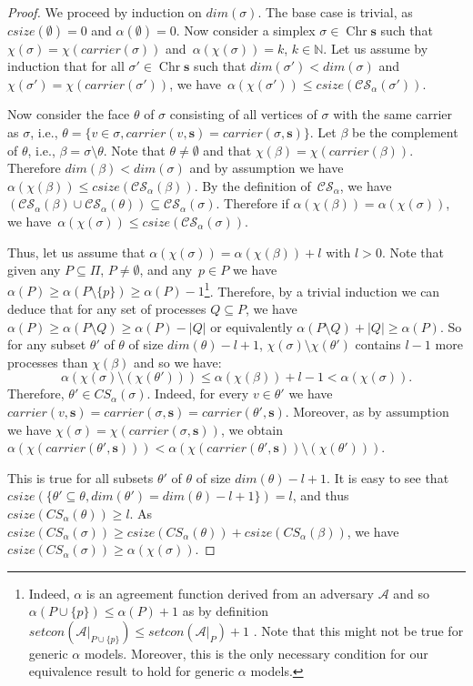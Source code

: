\documentclass[a4paper]{article}
\def\A{\ensuremath{\mathcal{A}}}
\def\HSS{\mathit{csize}}
\newcommand{\setcon}{\mathit{setcon}}
\def\s {\mathbf{s}}
\def\Chr{\operatorname{Chr}}
\def\Car{\mathit{carrier}}
\begin{document}
\begin{proof} 
We proceed by induction on ${\mathit{dim}}(\sigma)$. 
The base case is trivial, as 
$\HSS(\emptyset)=0$ and $\alpha(\emptyset)=0$.
Now consider a simplex $\sigma\in\Chr\s$ such that 
$\chi(\sigma)=\chi(\Car(\sigma))$ and~$\alpha(\chi(\sigma))= k$, $k\in\mathbb{N}$. 
Let us assume by induction that for all $\sigma'\in \Chr \s$ such that 
${\mathit{dim}}(\sigma')<{\mathit{dim}}(\sigma)$ and $\chi(\sigma')=\chi(\Car(\sigma'))$, we 
have~$\alpha(\chi(\sigma'))\leq \HSS(\mathcal{CS}_\alpha(\sigma'))$.

Now consider the face $\theta$ of $\sigma$ consisting of all vertices of $\sigma$ with the
same carrier as $\sigma$, i.e., $\theta=\{v\in\sigma, \Car(v,\s)=\Car(\sigma,\s)\}$. 
Let $\beta$ be the complement of $\theta$, i.e., $\beta=\sigma\setminus\theta$.
Note that $\theta\neq\emptyset$ and that $\chi(\beta)=\chi(\Car(\beta))$.
Therefore ${\mathit{dim}}(\beta)<{\mathit{dim}}(\sigma)$ and by assumption we have 
$\alpha(\chi(\beta))\leq \HSS(\mathcal{CS}_\alpha(\beta))$.
By the definition of~$\mathcal{CS}_\alpha$, we have 
$\left(\mathcal{CS}_\alpha(\beta)\cup\mathcal{CS}_\alpha(\theta)\right)\subseteq \mathcal{CS}_\alpha(\sigma)$.
Therefore if $\alpha(\chi(\beta))=\alpha(\chi(\sigma))$, we 
have~$\alpha(\chi(\sigma))\leq \HSS(\mathcal{CS}_\alpha(\sigma))$.

Thus, let us assume that $\alpha(\chi(\sigma))=\alpha(\chi(\beta))+l$ with $l>0$.
Note that given any $P\subseteq\Pi$, $P\neq\emptyset$, and any~$p\in P$ we have 
$\alpha(P)\geq\alpha(P\setminus\{p\})\geq\alpha(P)-1$\footnote{Indeed, $\alpha$
is an agreement function derived from an adversary $\A$ and so 
$\alpha(P\cup\{p\})\leq \alpha(P)+1$ as by definition $\setcon(\A|_{P\cup\{p\}})\leq \setcon(\A|_P)+1$ . 
Note that this might not be true for generic $\alpha$ models. Moreover, this 
is the only necessary condition for our equivalence result to hold for generic
$\alpha$ models.}. 
Therefore, by a trivial induction we can deduce that for any set of 
processes $Q\subseteq P$, we have $\alpha(P)\geq\alpha(P\setminus Q)\geq\alpha(P)-|Q|$ 
or equivalently $\alpha(P\setminus Q)+|Q|\geq\alpha(P)$.
So for any subset $\theta'$ of $\theta$ of size ${\mathit{dim}}(\theta)-l+1$, $\chi(\sigma)\setminus\chi(\theta')$ contains $l-1$ more processes than $\chi(\beta)$ and so we have:
\[
\alpha(\chi(\sigma)\setminus(\chi(\theta')))\leq 
\alpha(\chi(\beta))+l-1<
\alpha(\chi(\sigma)){}.
\]
Therefore, $\theta'\in CS_\alpha(\sigma)$. 
Indeed, for every $v\in\theta'$ we have 
$\Car(v,\s)=\Car(\sigma,\s)=\Car(\theta',\s)$.
Moreover, as by assumption we have $\chi(\sigma)=\chi(\Car(\sigma,\s))$,
we obtain $\alpha(\chi(\Car(\theta',\s)))<\alpha(\chi(\Car(\theta',\s))\setminus(\chi(\theta')))$.

This is true for all subsets $\theta'$ of $\theta$ of size ${\mathit{dim}}(\theta)-l+1$.
It is easy to see that $\HSS(\{\theta'\subseteq\theta, {\mathit{dim}}(\theta')={\mathit{dim}}(\theta)-l+1\})=l$, 
and thus $\HSS(CS_\alpha(\theta))\geq l$.
As $\HSS(CS_\alpha(\sigma)) \geq \HSS(CS_\alpha(\theta))+\HSS(CS_\alpha(\beta))$,
we have $\HSS(CS_\alpha(\sigma)) \geq\alpha(\chi(\sigma))$.
\end{proof}
\end{document}
